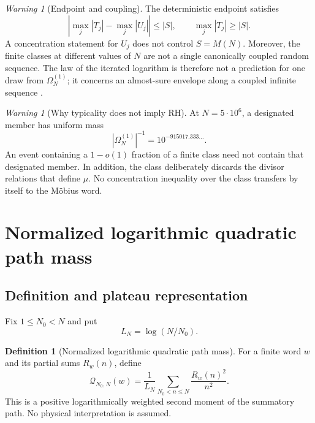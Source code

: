 \documentclass[11pt,reqno]{amsart}
\numberwithin{equation}{section}
\theoremstyle{plain}
\theoremstyle{definition}
\newtheorem{definition}[theorem]{Definition}
\theoremstyle{remark}
\newtheorem{warning}[theorem]{Warning}
\newcommand{\Om}{\Omega}
\newcommand{\QF}{\mathcal Q}
\begin{document}
\begin{warning}[Endpoint and coupling]
\label{warn:endpoint-and-coupling}
The deterministic endpoint satisfies
\begin{equation}
\left|\max_j|T_j|-\max_j|U_j|\right|\leq|S|,
\qquad \max_j|T_j|\geq|S|.
\label{eq:endpoint-obstruction}
\end{equation}
A concentration statement for \(U_j\) does not control \(S=M(N)\).
Moreover, the finite classes at different values of \(N\) are not a single
canonically coupled random sequence.  The law of the iterated logarithm is
therefore not a prediction for one draw from \(\Om_N^{(1)}\); it concerns an
almost-sure envelope along a coupled infinite sequence
\cite{HartmanWintner1941}.
\end{warning}

\begin{warning}[Why typicality does not imply RH]
\label{warn:typicality-not-rh}
At \(N=5\cdot10^6\), a designated member has uniform mass
\begin{equation}
|\Om_N^{(1)}|^{-1}=10^{-915017.333\ldots}.
\label{eq:single-word-class-mass}
\end{equation}
An event containing a \(1-o(1)\) fraction of a finite class need not contain
that designated member.  In addition, the class deliberately discards the
divisor relations that define \(\mu\).  No concentration inequality over the
class transfers by itself to the M\"obius word.
\end{warning}

\section{Normalized logarithmic quadratic path mass}
\label{sec:quadratic-mass}

\subsection{Definition and plateau representation}
\label{subsec:quadratic-mass-definition}

Fix \(1\leq N_0<N\) and put
\begin{equation}
L_N=\log(N/N_0).
\label{eq:logarithmic-span}
\end{equation}

\begin{definition}[Normalized logarithmic quadratic path mass]
\label{def:quadratic-path-mass}
For a finite word \(w\) and its partial sums \(R_w(n)\), define
\begin{equation}
\QF_{N_0,N}(w)
=\frac{1}{L_N}\sum_{N_0<n\leq N}\frac{R_w(n)^2}{n^2}.
\label{eq:quadratic-path-mass}
\end{equation}
This is a positive logarithmically weighted second moment of the summatory
path.  No physical interpretation is assumed.
\end{definition}
\end{document}
